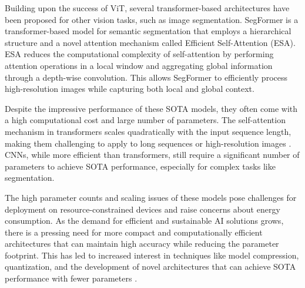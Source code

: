 \documentclass[conference]{IEEEtran}
\begin{document}
Building upon the success of ViT, several transformer-based architectures have been proposed for other vision tasks, such as image segmentation. SegFormer \cite{xie2021segformer} is a transformer-based model for semantic segmentation that employs a hierarchical structure and a novel attention mechanism called Efficient Self-Attention (ESA). ESA reduces the computational complexity of self-attention by performing attention operations in a local window and aggregating global information through a depth-wise convolution. This allows SegFormer to efficiently process high-resolution images while capturing both local and global context.

Despite the impressive performance of these SOTA models, they often come with a high computational cost and large number of parameters. The self-attention mechanism in transformers scales quadratically with the input sequence length, making them challenging to apply to long sequences or high-resolution images \cite{choromanski2020rethinking}. CNNs, while more efficient than transformers, still require a significant number of parameters to achieve SOTA performance, especially for complex tasks like segmentation.

The high parameter counts and scaling issues of these models pose challenges for deployment on resource-constrained devices and raise concerns about energy consumption. As the demand for efficient and sustainable AI solutions grows, there is a pressing need for more compact and computationally efficient architectures that can maintain high accuracy while reducing the parameter footprint. This has led to increased interest in techniques like model compression, quantization, and the development of novel architectures that can achieve SOTA performance with fewer parameters \cite{cheng2017survey, hinton2015distilling}.
\end{document}
